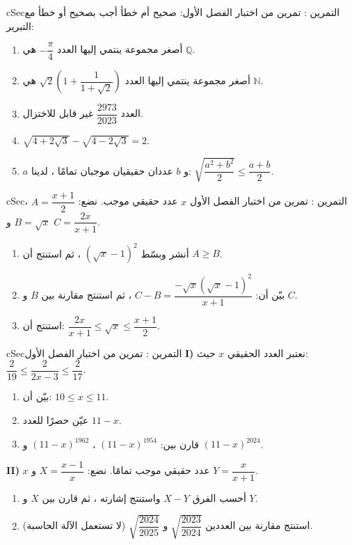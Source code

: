 \documentclass[12pt,a4paper]{article}
\newenvironment{BOX}[2]{\begin{otherlanguage}{english}\begin{arbox}{#1}{#2}}{\end{arbox}\end{otherlanguage}}
\newcounter{exo}
\newenvironment{tamrin}[1]{\stepcounter{exo}\begin{BOX}{cSec}{التمرين \theexo: #1}}{\end{BOX}}
\newcommand{\N}{\mathbb{N}}
\newcommand{\Q}{\mathbb{Q}}
\begin{document}
\begin{tamrin}{تمرين من اختبار الفصل الأول: صحيح أم خطأ}
أجب بصحيح أو خطأ مع التبرير:
\begin{enumerate}
\item أصغر مجموعة ينتمي إليها العدد $-\dfrac\pi4$ هي $\Q$.
\item أصغر مجموعة ينتمي إليها العدد $\sqrt2\left(1+\dfrac1{1+\sqrt2}\right)$ هي $\N$.
\item العدد $\dfrac{2973}{2023}$ غير قابل للاختزال.
\item $\sqrt{4+2\sqrt3}-\sqrt{4-2\sqrt3}=2$.
\item $a$ و $b$ عددان حقيقيان موجبان تمامًا ، لدينا: $\sqrt{\dfrac{a^2+b^2}2}\leqslant\dfrac{a+b}2$.
\end{enumerate}
\end{tamrin}

\begin{tamrin}{تمرين من اختبار الفصل الأول}
$x$ عدد حقيقي موجب. نضع: $A=\dfrac{x+1}2$ ، $B=\sqrt x$ و $C=\dfrac{2x}{x+1}$.
\begin{enumerate}
\item أنشر وبسّط $\left(\sqrt x-1\right)^2$ ، ثم استنتج أن $A\geqslant B$.
\item بيّن أن: $C-B=\dfrac{-\sqrt x\left(\sqrt x-1\right)^2}{x+1}$ ، ثم استنتج مقارنة بين $B$ و $C$.
\item استنتج أن: $\dfrac{2x}{x+1}\leqslant\sqrt x\leqslant\dfrac{x+1}2$.
\end{enumerate}
\end{tamrin}

\begin{tamrin}{تمرين من اختبار الفصل الأول}
\textbf{I)} نعتبر العدد الحقيقي $x$ حيث: $\dfrac2{19}\leqslant\dfrac2{2x-3}\leqslant\dfrac2{17}$.
\begin{enumerate}
\item بيّن أن: $10\leqslant x\leqslant11$.
\item عيّن حصرًا للعدد $11-x$.
\item قارن بين: $(11-x)^{1954}$ ، $(11-x)^{1962}$ و $(11-x)^{2024}$.
\end{enumerate}
\textbf{II)} $x$ عدد حقيقي موجب تمامًا. نضع: $X=\dfrac{x-1}x$ و $Y=\dfrac x{x+1}$.
\begin{enumerate}
\item أحسب الفرق $X-Y$ واستنتج إشارته ، ثم قارن بين $X$ و $Y$.
\item استنتج مقارنة بين العددين $\sqrt{\dfrac{2023}{2024}}$ و $\sqrt{\dfrac{2024}{2025}}$ (لا تستعمل الآلة الحاسبة).
\end{enumerate}
\end{tamrin}
\end{document}
